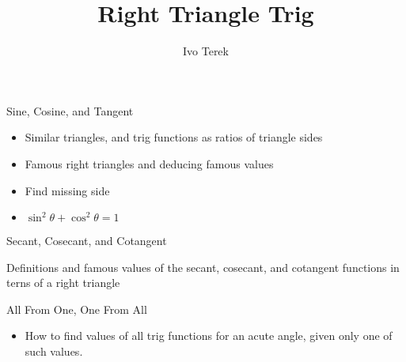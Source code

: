 \documentclass{ximera}
\author{Ivo Terek}
\title{Right Triangle Trig}
\begin{document}
\begin{abstract}
\end{abstract}
\maketitle


\begin{objectives}

\item Sine, Cosine, and Tangent
\begin{itemize}
	\item Similar triangles, and trig functions as ratios of triangle sides
        \item Famous right triangles and deducing famous values
        \item Find missing side
        \item $\sin^2\theta+\cos^2\theta=1$
\end{itemize}

\item Secant, Cosecant, and Cotangent
	\item Definitions and famous values of the secant, cosecant, and cotangent functions in terns of a right triangle 

\item All From One, One From All
\begin{itemize}
	\item How to find values of all trig functions for an acute angle, given only one of such values.
\end{itemize}


\end{objectives}
\end{document}
